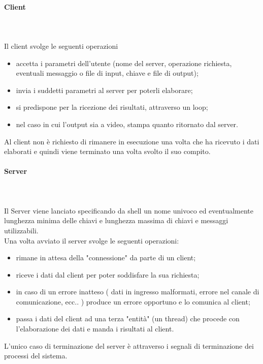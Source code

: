 \documentclass[12pt]{article}
\begin{document}
\paragraph{Client} \mbox{}\\ \\
Il client svolge le seguenti operazioni
\begin{itemize}
    \item accetta i parametri dell'utente (nome del server, operazione richiesta, eventuali messaggio o file di input, chiave e file di output);
    \item invia i suddetti parametri  al server per poterli elaborare;
    \item si predispone per la ricezione dei risultati, attraverso un loop;
    \item nel caso in cui l'output sia a video, stampa quanto ritornato dal server.
\end{itemize}
Al client non è richiesto di rimanere in esecuzione una volta che ha ricevuto i dati elaborati e quindi viene terminato una volta svolto il suo compito.

\paragraph{Server} \mbox{}\\ \\
Il Server viene lanciato specificando da shell un nome univoco ed eventualmente lunghezza minima delle chiavi e lunghezza massima di chiavi e messaggi utilizzabili. \\
Una volta avviato il server svolge le seguenti operazioni:
\begin{itemize}
    \item rimane in attesa della "connessione" da parte di un client;
    \item riceve i dati dal client per poter soddisfare la sua richiesta;
    \item in caso di un errore inatteso ( dati in ingresso malformati, errore nel canale di comunicazione, ecc.. ) produce un errore opportuno e lo comunica al client;
    \item passa i dati del client ad una terza "entità" (un thread) che procede con l'elaborazione dei dati e manda i risultati al client.
\end{itemize}
L'unico caso di terminazione del server è attraverso i segnali di terminazione dei processi del sistema.
\end{document}
